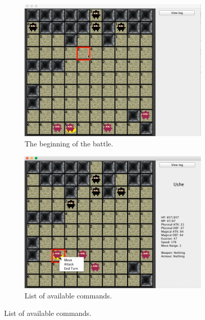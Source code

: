 \documentclass[a4paper,11pt]{article}
\begin{document}
\begin{figure}[H!]
	\centering
	\begin{subfigure}{.5\textwidth}
		\centering
		\includegraphics[width=.9\linewidth]{figures/battle0}
		\caption*{The beginning of the battle.}
	\end{subfigure}%
	\begin{subfigure}{.5\textwidth}
		\centering
		\includegraphics[width=.9\linewidth]{figures/battle4}
		\caption*{List of available commands.}
	\end{subfigure}%
	

\end{figure}
\end{document}
